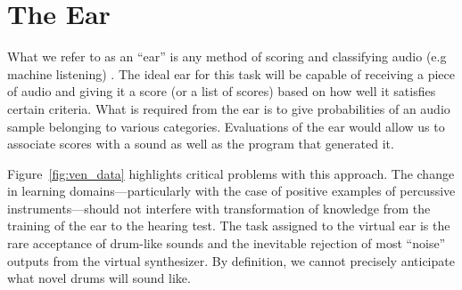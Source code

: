 \documentclass[\main/thesis.tex]{subfiles}
\begin{document}
\section{The Ear}
\label{sec:ear}
What we refer to as an \enquote{ear} is any method of scoring and classifying audio (e.g machine listening) \cite{malkin2006machine,rowe1992interactive}. The ideal ear for this task will be capable of receiving a piece of audio and giving it a score (or a list of scores) based on how well it satisfies certain criteria. What is required from the ear is to give probabilities of an audio sample belonging to various categories. Evaluations of the ear would allow us to associate scores with a sound as well as the program that generated it. 

Figure~\ref{fig:ven_data} highlights critical problems with this approach. The change in learning domains---particularly with the case of positive examples of percussive instruments---should not interfere with transformation of knowledge from the training of the ear to the hearing test. The task assigned to the virtual ear is the rare acceptance of drum-like sounds and the inevitable rejection of most \enquote{noise} outputs from the virtual synthesizer. By definition, we cannot precisely anticipate what novel drums will sound like. 


\end{document}
